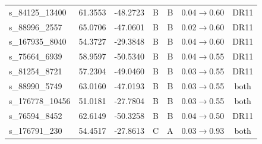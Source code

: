 {\begin{longtable}{lcccccc}
s\_84125\_13400 & 61.3553 & -48.2723 & B & B & 0.04$\to$0.60 & DR11\\
s\_88996\_2557 & 65.0706 & -47.0601 & B & B & 0.02$\to$0.60 & DR11\\
s\_167935\_8040 & 54.3727 & -29.3848 & B & B & 0.04$\to$0.60 & DR11\\
s\_75664\_6939 & 58.9597 & -50.5340 & B & B & 0.04$\to$0.55 & DR11\\
s\_81254\_8721 & 57.2304 & -49.0460 & B & B & 0.03$\to$0.55 & DR11\\
s\_88990\_5749 & 63.0160 & -47.0193 & B & B & 0.03$\to$0.55 & both\\
s\_176778\_10456 & 51.0181 & -27.7804 & B & B & 0.03$\to$0.55 & both\\
s\_76594\_8452 & 62.6149 & -50.3258 & B & B & 0.04$\to$0.50 & DR11\\
s\_176791\_230 & 54.4517 & -27.8613 & C & A & 0.03$\to$0.93 & both\\
\bottomrule
\end{longtable}
}
